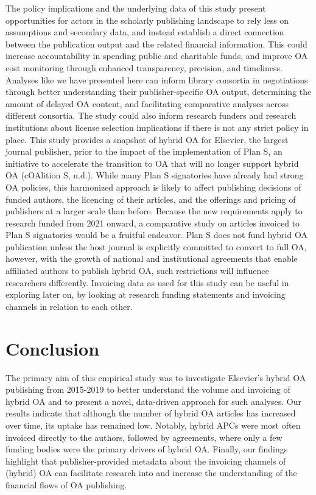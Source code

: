 \documentclass[a4paper,man,floatsintext,longtable,noextraspace,12pt]{apa6}
\begin{document}
The policy implications and the underlying data of this study present
opportunities for actors in the scholarly publishing landscape to rely
less on assumptions and secondary data, and instead establish a direct
connection between the publication output and the related financial
information. This could increase accountability in spending public and
charitable funds, and improve OA cost monitoring through enhanced
transparency, precision, and timeliness. Analyses like we have presented
here can inform library consortia in negotiations through better
understanding their publisher-specific OA output, determining the amount
of delayed OA content, and facilitating comparative analyses across
different consortia. The study could also inform research funders and
research institutions about license selection implications if there is
not any strict policy in place. This study provides a snapshot of hybrid
OA for Elsevier, the largest journal publisher, prior to the impact of
the implementation of Plan S, an initiative to accelerate the transition
to OA that will no longer support hybrid OA (cOAlition S, n.d.). While
many Plan S signatories have already had strong OA policies, this
harmonized approach is likely to affect publishing decisions of funded
authors, the licencing of their articles, and the offerings and pricing
of publishers at a larger scale than before. Because the new
requirements apply to research funded from 2021 onward, a comparative
study on articles invoiced to Plan S signatories would be a fruitful
endeavor. Plan S does not fund hybrid OA publication unless the host
journal is explicitly committed to convert to full OA, however, with the
growth of national and institutional agreements that enable affiliated
authors to publish hybrid OA, such restrictions will influence
researchers differently. Invoicing data as used for this study can be
useful in exploring later on, by looking at research funding statements
and invoicing channels in relation to each other.

\hypertarget{conclusion}{%
\section{Conclusion}\label{conclusion}}

The primary aim of this empirical study was to investigate Elsevier's
hybrid OA publishing from 2015-2019 to better understand the volume and
invoicing of hybrid OA and to present a novel, data-driven approach for
such analyses. Our results indicate that although the number of hybrid
OA articles has increased over time, its uptake has remained low.
Notably, hybrid APCs were most often invoiced directly to the authors,
followed by agreements, where only a few funding bodies were the primary
drivers of hybrid OA. Finally, our findings highlight that
publisher-provided metadata about the invoicing channels of (hybrid) OA
can facilitate research into and increase the understanding of the
financial flows of OA publishing.
\end{document}
